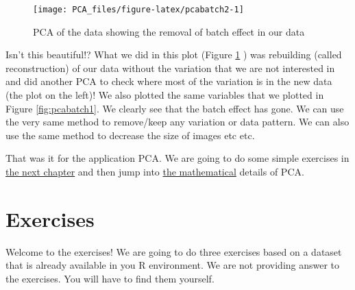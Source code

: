 \documentclass[
]{book}
\newenvironment{Shaded}{\begin{snugshade}}{\end{snugshade}}
\newcommand{\DataTypeTok}[1]{\textcolor[rgb]{0.13,0.29,0.53}{#1}}
\newcommand{\DecValTok}[1]{\textcolor[rgb]{0.00,0.00,0.81}{#1}}
\newcommand{\KeywordTok}[1]{\textcolor[rgb]{0.13,0.29,0.53}{\textbf{#1}}}
\newcommand{\NormalTok}[1]{#1}
\newcommand{\OperatorTok}[1]{\textcolor[rgb]{0.81,0.36,0.00}{\textbf{#1}}}
\newcommand{\StringTok}[1]{\textcolor[rgb]{0.31,0.60,0.02}{#1}}
\theoremstyle{definition}
\theoremstyle{definition}
\theoremstyle{definition}
\theoremstyle{remark}
\begin{document}
\begin{Shaded}
\begin{Highlighting}[]
{\KeywordTok{plot}\NormalTok{(new_data[,(}\KeywordTok{order}\NormalTok{(}\KeywordTok{abs}\NormalTok{(pcaResults}\OperatorTok{$}\NormalTok{rotation[,}\DecValTok{1}\NormalTok{]),}\DataTypeTok{decreasing =}\NormalTok{ T)[}\DecValTok{1}\OperatorTok{:}\DecValTok{2}\NormalTok{])],}\DataTypeTok{xlab=}\KeywordTok{paste}\NormalTok{(}\StringTok{"Variable"}\NormalTok{,}\KeywordTok{names}\NormalTok{(PC1_rotations)[}\DecValTok{1}\NormalTok{]),}
     \DataTypeTok{ylab=}\KeywordTok{paste}\NormalTok{(}\StringTok{"Variable"}\NormalTok{,}\KeywordTok{names}\NormalTok{(PC1_rotations)[}\DecValTok{2}\NormalTok{]),}\DataTypeTok{pch=}\KeywordTok{as.numeric}\NormalTok{(}\KeywordTok{factor}\NormalTok{(metadata}\OperatorTok{$}\NormalTok{Batch)))}
\KeywordTok{title}\NormalTok{(}\StringTok{"Original variables"}\NormalTok{)}
\end{Highlighting}
\end{Shaded}

\begin{figure}

{\centering \texttt{[image: PCA\_files/figure-latex/pcabatch2-1]} 

}

\caption{PCA of the data showing the removal of batch effect in our data}\label{fig:pcabatch2}
\end{figure}

Isn't this beautiful!? What we did in this plot (Figure \ref{fig:pcabatch2} ) was rebuilding (called reconstruction) of our data without the variation that we are not interested in and did another PCA to check where most of the variation is in the new data (the plot on the left)! We also plotted the same variables that we plotted in Figure \ref{fig:pcabatch1}. We clearly see that the batch effect has gone. We can use the very same method to remove/keep any variation or data pattern. We can also use the same method to decrease the size of images etc etc.

That was it for the application PCA. We are going to do some simple exercises in \protect\hyperlink{exer}{the next chapter} and then jump into \protect\hyperlink{pcamath}{the mathematical} details of PCA.

\hypertarget{exer}{%
\chapter{Exercises}\label{exer}}

Welcome to the exercises! We are going to do three exercises based on a dataset that is already available in you R environment. We are not providing answer to the exercises. You will have to find them yourself.
\end{document}
